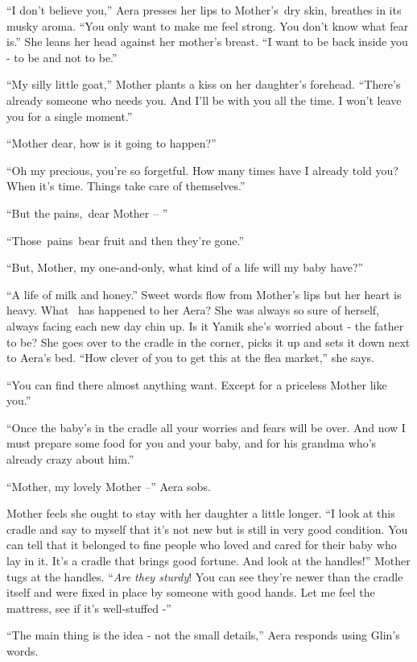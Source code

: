 \documentclass[twoside,11pt]{book}
\begin{document}
``I don't believe you,'' Aera presses her lips{ }to Mother's~dry skin, breathes
in its musky aroma. ``You only want to make me feel strong. You don't know what fear is.''
She leans her head against her mother's breast. ``I want to be back inside you - to be and not to
be.''

``My silly little goat,'' Mother plants a kiss on her daughter's forehead.
``There's already someone who needs you. And I'll be with you all the time. I won't leave you for a single
moment.''

``Mother dear, how is it going to happen?''

``Oh my precious, you're so forgetful. How many times have I already told you? When it's time. Things take
care of themselves.''

``But the pains,~dear Mother -- ''

``Those~pains~bear fruit and then they're gone.''

``But, Mother, my one-and-only, what kind of a life will my baby have?''

``A life of milk and honey.'' Sweet words flow from Mother's lips but her heart is heavy. What
\ has happened to her Aera? She was always so sure of herself, always facing each new day chin up. Is it Yamik she's
worried about - the father to be? She goes over to the cradle in the corner, picks it up and sets it down next to
Aera's bed. ``How clever of you to get this at the flea market,'' she says.

``You can find there almost anything want. Except for a priceless Mother like you.''

``Once the baby's in the cradle all your worries and fears will be over. And now I must prepare some food
for you and your baby, and for his grandma who's already crazy about him.''

``Mother, my lovely Mother --'' Aera sobs. ~

Mother feels she ought to stay with her daughter a little longer. ``I look at this cradle and say to myself
that it's not new but is{ }still in very good condition. You can tell that it belonged to fine people
who loved and cared for their baby who lay in it. It's a cradle that brings good fortune. And look at the
handles!'' Mother tugs at the handles. ``\textit{Are they sturdy}! You can see they're newer
than the cradle itself and were fixed in place by someone with good hands. Let me feel the mattress, see if it's
well-stuffed -''

``The main thing is the idea - not the small details,'' Aera responds using Glin's words.
\end{document}
